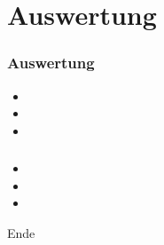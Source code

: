 \documentclass{beamer}
\begin{document}
\section{Auswertung}
\begin{frame}\frametitle{Auswertung}
	\begin{itemize}
		\item 
		\item 
		\item 
	\end{itemize} 
\end{frame}

\begin{frame}\frametitle{} 
	\begin{itemize}
		\item 
		\item 
		\item 
	\end{itemize} 
\end{frame}

\begin{frame}
	\begin{center}
		\begin{Huge}
			Ende
		\end{Huge}
	\end{center}
\end{frame}
\end{document}
